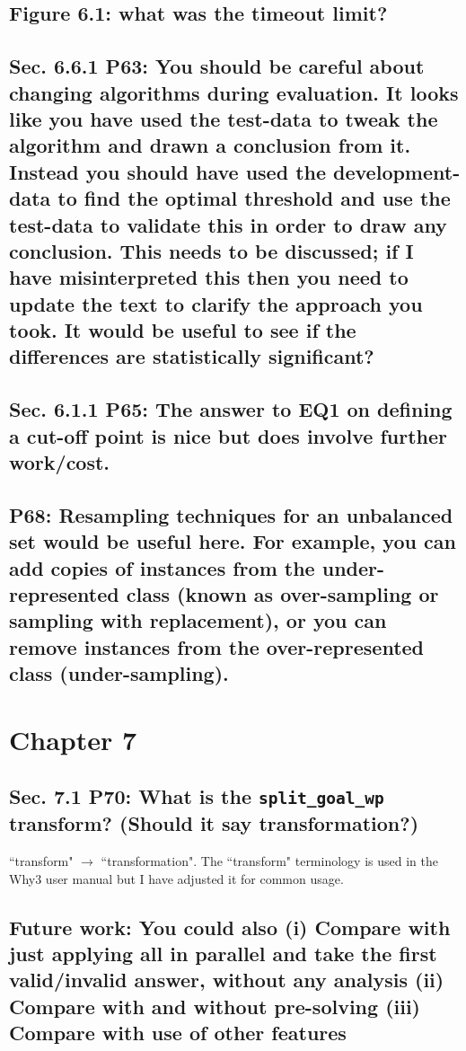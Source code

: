 \documentclass[]{article}
\begin{document}
\subsection{Figure 6.1: what was the timeout limit?}

\subsection{Sec. 6.6.1 P63: You should be careful about changing algorithms during evaluation. It looks like you have used the test-data to tweak the algorithm and drawn a conclusion from it. Instead you should have used the development-data to find the optimal threshold and use the test-data to validate this in order to draw any conclusion. This needs to be discussed; if I have	misinterpreted this then you need to update the text to clarify the approach you took. It would be useful to see if the differences are statistically significant?}

\subsection{Sec. 6.1.1 P65: The answer to EQ1 on defining a cut-off point is nice but does involve further work/cost.}

\subsection{P68: Resampling techniques for an unbalanced set would be useful here. For example, you can add copies of instances from the under-represented class (known as over-sampling or sampling with replacement), or you can remove instances from the over-represented class (under-sampling).}

\section{Chapter 7}

\subsection{Sec. 7.1 P70: What is the \texttt{split\_goal\_wp} transform? (Should it say transformation?)}

``transform" $\rightarrow$ ``transformation". The ``transform" terminology is used in the \textsf{Why3} user manual but I have adjusted it for common usage. 

\subsection{Future work: You could also (i) Compare with just applying all in parallel and take the first valid/invalid answer,	without any analysis (ii) Compare with and without pre-solving (iii) Compare with use of other features}
\end{document}

